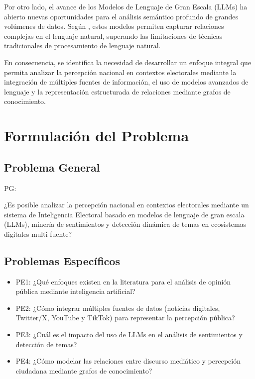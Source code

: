 \documentclass[listof=nochaptergap,12pt,times,authoryear]{report}
\begin{document}
Por otro lado, el avance de los Modelos de Lenguaje de Gran Escala (LLMs) ha abierto nuevas oportunidades para el análisis semántico profundo de grandes volúmenes de datos. Según \textcite{cr_bommasani2021foundation}, estos modelos permiten capturar relaciones complejas en el lenguaje natural, superando las limitaciones de técnicas tradicionales de procesamiento de lenguaje natural.

En consecuencia, se identifica la necesidad de desarrollar un enfoque integral que permita analizar la percepción nacional en contextos electorales mediante la integración de múltiples fuentes de información, el uso de modelos avanzados de lenguaje y la representación estructurada de relaciones mediante grafos de conocimiento.

\section{Formulación del Problema}

\subsection{Problema General}
PG: \newcommand{\ProblemaGeneral}{
¿Es posible analizar la percepción nacional en contextos electorales mediante un sistema de Inteligencia Electoral basado en modelos de lenguaje de gran escala (LLMs), minería de sentimientos y detección dinámica de temas en ecosistemas digitales multi-fuente?
}
\ProblemaGeneral

\subsection{Problemas Específicos}

\newcommand{\Pbone}{¿Qué enfoques existen en la literatura para el análisis de opinión pública mediante inteligencia artificial?}
\newcommand{\Pbtwo}{¿Cómo integrar múltiples fuentes de datos (noticias digitales, Twitter/X, YouTube y TikTok) para representar la percepción pública?}
\newcommand{\Pbthree}{¿Cuál es el impacto del uso de LLMs en el análisis de sentimientos y detección de temas?}
\newcommand{\Pbfour}{¿Cómo modelar las relaciones entre discurso mediático y percepción ciudadana mediante grafos de conocimiento?}

\begin{itemize}
	\item PE1: {\Pbone}
	\item PE2: {\Pbtwo}
	\item PE3: {\Pbthree}
	\item PE4: {\Pbfour}
\end{itemize}
\end{document}
